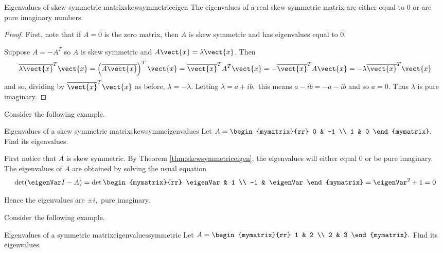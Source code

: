 \begin{theorem}{Eigenvalues of skew symmetric matrix}{skewsymmetriceigen}
The eigenvalues of a real skew symmetric matrix are either equal to $0$ or are pure imaginary numbers.
\end{theorem}

\begin{proof}
First, note that if $A=0$ is the zero matrix, then $A$ is skew symmetric and has eigenvalues equal to $0$. 

Suppose $A=-A^{T}$ so $A$ is skew symmetric and $A\vect{x}=\lambda 
\vect{x}$. Then 
\begin{equation*}
\overline{\lambda \vect{x}}^{T}\vect{x}=\left( \overline{A
\vect{x}}\right) ^{T}\vect{x}=\overline{\vect{x}}^{T}A^{T}\vect{x}=-
\overline{\vect{x}}^{T}A\vect{x}=-\lambda \overline{\vect{x}}^{T}
\vect{x}
\end{equation*}
and so, dividing by $\overline{\vect{x}}^{T}\vect{x}$ as before, $
\overline{\lambda }=-\lambda .$ Letting $\lambda =a+ib,$ this means $
a-ib=-a-ib$ and so $a=0.$ Thus $\lambda $ is pure imaginary. 
\end{proof}

Consider the following example. 

\begin{example}{Eigenvalues of a skew symmetric matrix}{skewsymmeigenvalues}
Let $A=\begin{mymatrix}{rr}
0 & -1 \\
1 & 0
\end{mymatrix} .$  Find its eigenvalues.
\end{example}

\begin{solution}
First notice that $A$ is skew symmetric. By Theorem \ref{thm:skewsymmetriceigen}, the eigenvalues will either equal $0$ or be pure imaginary.  The eigenvalues of $A$ are obtained by solving the usual equation 
\[
\det (\eigenVar I - A ) = 
\det \begin{mymatrix}{rr}
\eigenVar & 1 \\ 
-1 & \eigenVar
\end{mymatrix} =\eigenVar ^{2}+1=0
\]

Hence the eigenvalues are $\pm i,$ pure
imaginary.
\end{solution}

Consider the following example.

\begin{example}{Eigenvalues of a symmetric matrix}{eigenvaluessymmetric}
Let $A=\begin{mymatrix}{rr}
1 & 2 \\
2 & 3
\end{mymatrix} .$ Find its eigenvalues.
\end{example}

